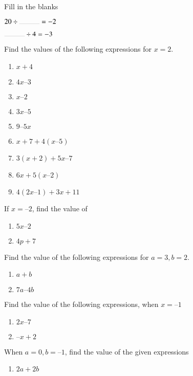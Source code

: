 Fill in the blanks
\begin{enumerate}[label=\thesubsection.\arabic*, ref=\thesubsection.\theenumi,resume*]
	\begin{multicols}{2}
		\item	$20 \div \rule{1cm}{0.1pt}=-2$
		\item	$\rule{1cm}{0.1pt}\div 4=-3$
	\end{multicols}
\end{enumerate}
Find the values of the following expressions for $x = 2$. 
\begin{enumerate}[label=\thesubsection.\arabic*, ref=\thesubsection.\theenumi,resume*]
\item $x + 4$
\item  $4x – 3$ 
\item $ x – 2$
\item $ 3x – 5 $
\item $ 9 – 5x $
\item $ x + 7 + 4 (x – 5)$
\item $ 3 (x + 2) + 5x – 7 $
\item $ 6x + 5 (x – 2) $
\item $ 4(2x – 1) + 3x + 11$
\end{enumerate}
If $x = – 2$, find the value of
\begin{enumerate}[label=\thesubsection.\arabic*, ref=\thesubsection.\theenumi,resume*]
\item $5x – 2$
\item $4p + 7$
\end{enumerate}
Find the value of the following expressions for $a = 3, b = 2$. 
\begin{enumerate}[label=\thesubsection.\arabic*, ref=\thesubsection.\theenumi,resume*]
\item $a + b$				
\item $ 7a – 4b $
\end{enumerate}
Find the value of the following expressions, when $x = –1$ 
\begin{enumerate}[label=\thesubsection.\arabic*, ref=\thesubsection.\theenumi,resume*]
\item $ 2x – 7$
\item $ – x + 2$ 
\end{enumerate}
When $a = 0, b = – 1$, find the value of the given expressions
\begin{enumerate}[label=\thesubsection.\arabic*, ref=\thesubsection.\theenumi,resume*]
\item $2a + 2b$
\end{enumerate}
